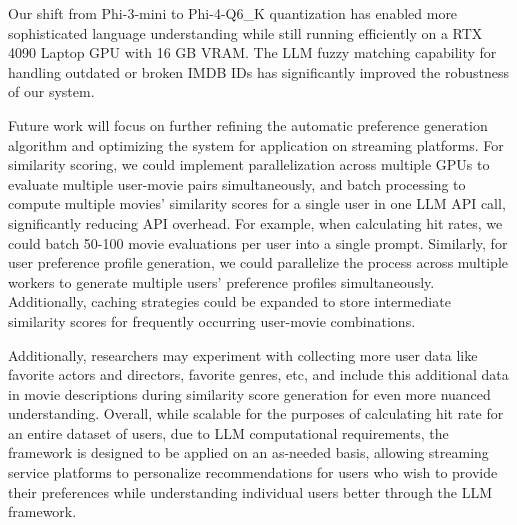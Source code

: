 \documentclass[sigconf]{acmart}
\newcommand{\changeAD}[1]{\textcolor{red}{AD: #1}}
\begin{document}
Our shift from Phi-3-mini to Phi-4-Q6\_K quantization has enabled more sophisticated language understanding while still running efficiently on a RTX 4090 Laptop GPU with 16 GB VRAM. The LLM fuzzy matching capability for handling outdated or broken IMDB IDs has significantly improved the robustness of our system.

Future work will focus on further refining the automatic preference generation algorithm and optimizing the system for application on streaming platforms. For similarity scoring, we could implement parallelization across multiple GPUs to evaluate multiple user-movie pairs simultaneously, and batch processing to compute multiple movies' similarity scores for a single user in one LLM API call, significantly reducing API overhead. For example, when calculating hit rates, we could batch 50-100 movie evaluations per user into a single prompt. Similarly, for user preference profile generation, we could parallelize the process across multiple workers to generate multiple users' preference profiles simultaneously. Additionally, caching strategies could be expanded to store intermediate similarity scores for frequently occurring user-movie combinations.

Additionally, researchers may experiment with collecting more user data like favorite actors and directors, favorite genres, etc, and include this additional data in movie descriptions during similarity score generation for even more nuanced understanding. Overall, while scalable for the purposes of calculating hit rate for an entire dataset of users, due to LLM computational requirements, the framework is designed to be applied on an as-needed basis, allowing streaming service platforms to personalize recommendations for users who wish to provide their preferences while understanding individual users better through the LLM framework.






%
\end{document}
